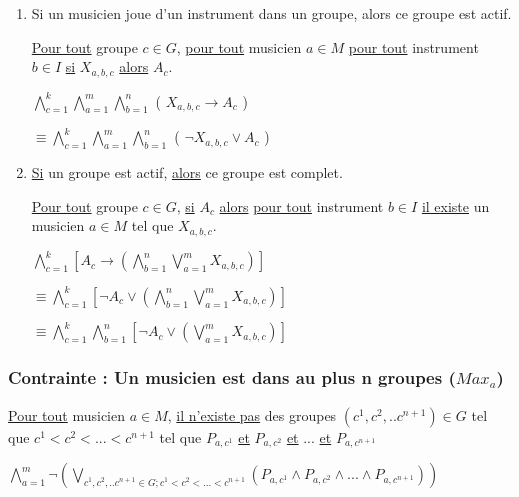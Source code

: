 \documentclass[a4paper,10pt]{article}
\begin{document}
\begin{enumerate}

 \item Si un musicien joue d'un instrument dans un groupe, alors ce groupe est actif.
 
    \underline{Pour tout} groupe $c \in G$, \underline{pour tout} musicien $a \in M$ \underline{pour tout} instrument $b \in I$  \underline{si} $X_{a,b,c}$ \underline{alors} $A_c$.
    
    $ \bigwedge \limits_{c=1}^{k} \bigwedge \limits_{a=1}^{m} \bigwedge \limits_{b=1}^{n}$ ( $ X_{a,b,c} \rightarrow A_c$ )
    
    $\equiv \bigwedge \limits_{c=1}^{k} \bigwedge \limits_{a=1}^{m} \bigwedge \limits_{b=1}^{n}$ ( $ \neg  X_{a,b,c} \vee A_c$ )

 
 
 \item \underline{Si} un groupe est actif, \underline {alors} ce groupe est complet.
 
    \underline{Pour tout} groupe $c \in G$, \underline{si} $A_c$ \underline{alors} \underline{pour tout} instrument $b \in I$ \underline{il existe} un musicien $a \in M$
    tel que $X_{a,b,c}$.
    
    
    $ \bigwedge \limits_{c=1}^{k} [ A_c \rightarrow (  \bigwedge \limits_{b=1}^{n} \bigvee \limits_{a=1}^{m} X_{a,b,c} ) ]$
    
    $\equiv \bigwedge \limits_{c=1}^{k} [ \neg A_c \vee (  \bigwedge \limits_{b=1}^{n} \bigvee \limits_{a=1}^{m} X_{a,b,c} ) ]$
    
    $\equiv \bigwedge \limits_{c=1}^{k} \bigwedge \limits_{b=1}^{n}  [ \neg A_c \vee ( \bigvee \limits_{a=1}^{m} X_{a,b,c} ) ]$
 
\end{enumerate}

\subsubsection{Contrainte : Un musicien est dans au plus n groupes ($Max_a$)}

\underline{Pour tout} musicien $a \in M$, \underline{il n'existe pas} des groupes $(c^1,c^2,..c^{n+1}) \in G$ tel que $c^1 < c^2 <...<c^{n+1}$ tel que $P_{a,c^1}$ \underline{et} $P_{a,c^2}$
\underline{et} ... \underline{et} $P_{a,c^{n+1}}$
 
$ \bigwedge \limits_{a=1}^{m} \neg ( \bigvee \limits_{c^1,c^2,..c^{n+1} \in G; c^1 < c^2 <...<c^{n+1}} ( P_{a,c^1} \wedge P_{a,c^2} \wedge ... \wedge P_{a,c^{n+1}} ))$
\end{document}
